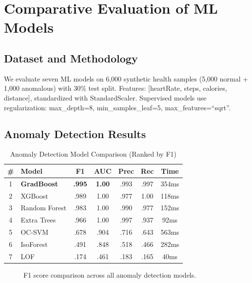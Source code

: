 \section{Comparative Evaluation of ML Models}

\subsection{Dataset and Methodology}
We evaluate seven ML models on 6,000 synthetic health samples (5,000 normal + 1,000 anomalous) with 30\% test split. Features: [heartRate, steps, calories, distance], standardized with StandardScaler. Supervised models use regularization: max\_depth=8, min\_samples\_leaf=5, max\_features=``sqrt''.

\subsection{Anomaly Detection Results}

\begin{table}[H]
\centering
\caption{Anomaly Detection Model Comparison (Ranked by F1)}
\label{tab:anomaly_results}
\begin{tabular}{clccccc}
\toprule
\textbf{\#} & \textbf{Model} & \textbf{F1} & \textbf{AUC} & \textbf{Prec} & \textbf{Rec} & \textbf{Time} \\
\midrule
1 & \textbf{GradBoost} & \textbf{.995} & \textbf{1.00} & .993 & .997 & 354ms \\
2 & XGBoost & .989 & 1.00 & .977 & 1.00 & 118ms \\
3 & Random Forest & .983 & 1.00 & .990 & .977 & 152ms \\
4 & Extra Trees & .966 & 1.00 & .997 & .937 & 92ms \\
5 & OC-SVM & .678 & .904 & .716 & .643 & 563ms \\
6 & IsoForest & .491 & .848 & .518 & .466 & 282ms \\
7 & LOF & .174 & .461 & .183 & .165 & 40ms \\
\bottomrule
\end{tabular}
\end{table}

\begin{figure}[H]
\centering
{}
\caption{F1 score comparison across all anomaly detection models.}
\label{fig:f1_comparison}
\end{figure}

